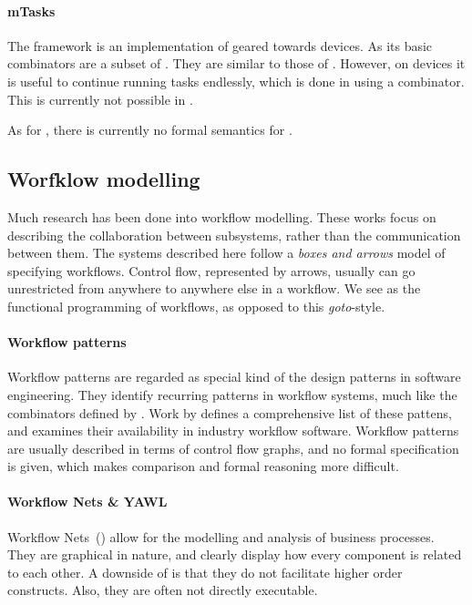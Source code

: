 \paragraph{mTasks}

The \MTASKS framework \cite{koopman2018task} is an implementation of \TOP geared towards \IOT devices.
As \TOPHAT its basic combinators are a subset of \ITASKS.
They are similar to those of \TOPHAT.
However, on \IOT devices it is useful to continue running tasks endlessly,
which is done in \MTASKS using a  combinator.
This is currently not possible in \TOPHAT.

As for \ITASKS, there is currently no formal semantics for \MTASKS.



\subsection{Worfklow modelling}

Much research has been done into workflow modelling. These works focus on
describing the collaboration between subsystems, rather than the communication
between them.
The systems described here follow a \emph{boxes and arrows} model of specifying workflows.
Control flow, represented by arrows, usually can go unrestricted from anywhere to anywhere else in a workflow.
We see \TOP as the functional programming of workflows, as opposed to this \emph{goto}-style.

\paragraph{Workflow patterns}

Workflow patterns are regarded as special kind of the design patterns in
software engineering. They identify recurring patterns in workflow systems, much
like the combinators defined by \TOPHAT. Work by \citet{journals/dpd/AalstHKB03}
defines a comprehensive list of these
pattens, and examines their availability in industry workflow software.
Workflow patterns are usually described in terms of control flow graphs, and no
formal specification is given, which makes comparison and formal reasoning more
difficult.

\paragraph{Workflow Nets \& YAWL}

Workflow Nets~(\WFN) \cite{journals/jcsc/Aalst98} allow for the modelling and analysis of business processes.
They are graphical in nature, and clearly display how every component is related to each other.
A downside of \WFN is that they do not facilitate higher order constructs.
Also, they are often not directly executable.

